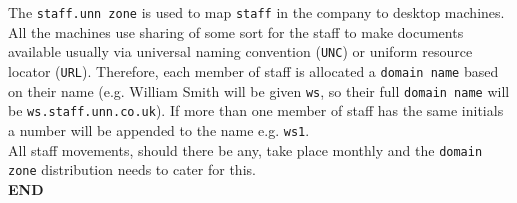\documentclass[11pt]{article}
\begin{document}
The \texttt{staff.unn zone} is used to map \texttt{staff} in the company to desktop machines. All the machines use sharing of some sort for the staff to 
make documents available usually via universal naming convention (\texttt{UNC}) or uniform resource locator (\texttt{URL}). Therefore, each member of staff 
is allocated a \texttt{domain name} based on their name (e.g. William Smith will be given \texttt{ws}, so their full \texttt{domain name} will be 
\texttt{ws.staff.unn.co.uk}). If more than one member of staff has the same initials a number will be appended to the name e.g. \texttt{ws1}.\\

\noindent All staff movements, should there be any, take place monthly and the \texttt{domain zone} distribution needs to cater for this.\\

\noindent \textbf{END}
\end{document}
